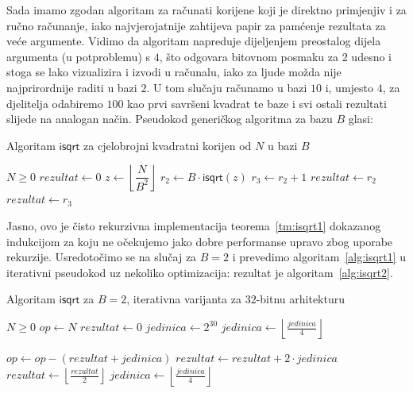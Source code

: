 \documentclass[12pt]{scrartcl}
\begin{document}
Sada imamo zgodan algoritam za računati korijene koji je direktno primjenjiv i za ručno računanje, iako najvjerojatnije zahtijeva papir
za pamćenje rezultata za veće argumente. Vidimo da algoritam napreduje dijeljenjem preostalog dijela argumenta (u potproblemu) s $4$, što
odgovara bitovnom posmaku za 2 udesno i stoga se lako vizualizira i izvodi u računalu, iako za ljude možda nije najprirordnije raditi u bazi $2$.
U tom slučaju računamo u bazi $10$ i, umjesto $4$, za djelitelja odabiremo $100$ kao prvi savršeni kvadrat te baze i svi ostali rezultati slijede
na analogan način. Pseudokod generičkog algoritma za bazu $B$ glasi:
\begin{algorithm}
    \caption{Algoritam $\mathsf{isqrt}$ za cjelobrojni kvadratni korijen od $N$ u bazi $B$}\label{alg:isqrt1}
    \begin{algorithmic}
    \Require $N \geq 0$
        \State $rezultat \gets 0$
    \Else
        \State $z \gets \left\lfloor\dfrac{N}{B^2}\right\rfloor$
        \State $r_2 \gets B \cdot \mathsf{isqrt}(z)$
        \State $r_3 \gets r_2 + 1$
            \State $rezultat \gets r_2$
        \Else
            \State $rezultat \gets r_3$
        \EndIf
    \EndIf
    \end{algorithmic}
\end{algorithm}

Jasno, ovo je čisto rekurzivna implementacija teorema~\ref{tm:isqrt1} dokazanog indukcijom za koju ne očekujemo jako dobre performanse upravo zbog
uporabe rekurzije. Usredotočimo se na slučaj za $B=2$ i prevedimo algoritam~\ref{alg:isqrt1} u iterativni pseudokod uz nekoliko optimizacija: rezultat
je algoritam~\ref{alg:isqrt2}.
\begin{algorithm}
    \caption{Algoritam $\mathsf{isqrt}$ za $B=2$, iterativna varijanta za $32$-bitnu arhitekturu~\cite{guysqrt}}\label{alg:isqrt2}
    \begin{algorithmic}[1]
    \Require $N \geq 0$
    \State $op \gets N$
    \State $rezultat \gets 0$
    \State $jedinica \gets 2^{30}$
        \State $jedinica \gets \left\lfloor\frac{jedinica}{4}\right\rfloor$
    \EndWhile

            \State $op \gets op - (rezultat + jedinica)$
            \State $rezultat \gets rezultat + 2 \cdot jedinica$\label{line:rezupd}
        \EndIf
        \State $rezultat \gets \left\lfloor\frac{rezultat}{2}\right\rfloor$
        \State $jedinica \gets \left\lfloor\frac{jedinica}{4}\right\rfloor$
    \EndWhile
    \end{algorithmic}
\end{algorithm}
\end{document}
